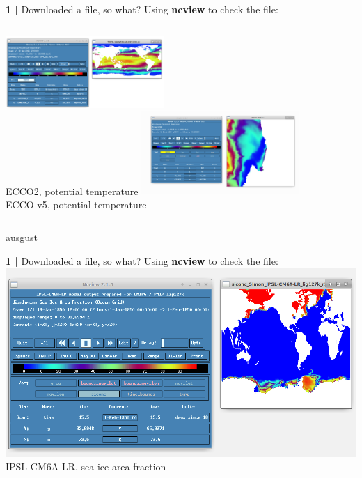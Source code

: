 \begin{frame}{\textbf{1 |} Downloaded a file, so what?}
    Using \textbf{ncview} to check the file:
    \begin{columns}
        \column[c]{6.5cm}
            \centering\includegraphics[width=6cm]{images/Theta.png} \\
                \centering\tiny{ECCO2, potential temperature}
        \column[c]{6.5cm}
            \centering\includegraphics[width=6cm]{images/MIT_eccoV5.png} \\
                \centering\tiny{ECCO v5, potential temperature}
    \end{columns}
\end{frame}
ausgust 

\begin{frame}{\textbf{1 |} Downloaded a file, so what?}
    Using \textbf{ncview} to check the file:
    \includegraphics[scale=0.3]{images/tripolar.png}
        \centering\tiny{IPSL-CM6A-LR, sea ice area fraction}
\end{frame}


